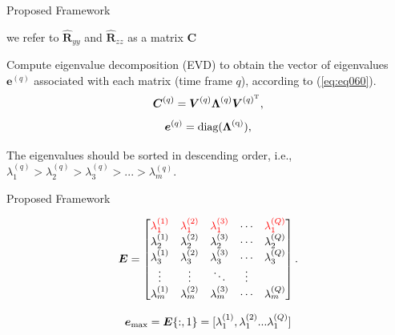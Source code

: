 \documentclass[newPxFont, numfooter, sectionpages]{beamer}
\begin{document}
\begin{frame}{Proposed Framework}
	
	we refer to $\boldsymbol{\hat{R}}_{yy}$ and $\boldsymbol{\hat{R}}_{zz}$ as a matrix $\boldsymbol{C}$

	Compute eigenvalue decomposition (EVD) to obtain the vector of eigenvalues $\boldsymbol{e}^{(q)}$ associated with each matrix (time frame $q$), according to (\ref{eq:eq060}).
	\begin{equation}\label{eq:eq06}
	\boldsymbol{C}^{(q)} = \boldsymbol{V}^{(q)}\boldsymbol{\Lambda}^{(q)}\boldsymbol{V}^{(q)^{\rm T}},
	\end{equation}
	\begin{equation}\label{eq:eq060}
	\boldsymbol{e}^{(q)} = \rm diag(\boldsymbol{\Lambda}^{(q)}),
	\end{equation}

	The eigenvalues should be sorted in descending order, i.e., $\lambda_{1}^{(q)} > \lambda_{2}^{(q)} > \lambda_{3}^{(q)} > ... > \lambda_{m}^{(q)}$.

\end{frame}
\begin{frame}{Proposed Framework}
	
	\begin{equation}\label{eq:eq07}
		\boldsymbol{E} =
		\begin{bmatrix}
			\color{red}\lambda_1^{(1)} & \color{red}\lambda_1^{(2)} & \color{red}\lambda_1^{(3)} & \cdots & \color{red}\lambda_1^{(Q)} \\
			\lambda_2^{(1)} & \lambda_2^{(2)} & \lambda_2^{(3)} & \cdots & \lambda_2^{(Q)} \\
			\lambda_3^{(1)} & \lambda_3^{(2)} & \lambda_3^{(3)} & \cdots & \lambda_3^{(Q)} \\
			\vdots & \vdots & \ddots & \vdots  \\
			\lambda_m^{(1)} & \lambda_m^{(2)} & \lambda_m^{(3)} & \cdots & \lambda_m^{(Q)} \\
		\end{bmatrix}.
	\end{equation}

	\begin{equation}\label{eq:eq08}
		\boldsymbol{e}_{\rm max} = \boldsymbol{E}\{:,1\} = [ \lambda_1^{(1)}, \lambda_1^{(2)} ... \lambda_1^{(Q)}]
	\end{equation}

\end{frame}
\end{document}
